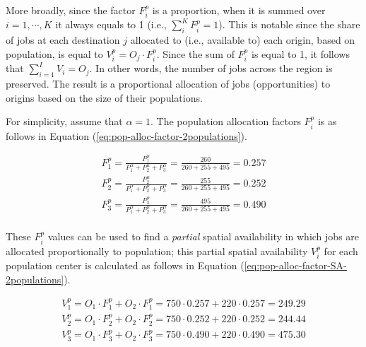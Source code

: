 \documentclass[]{elsarticle} %
\begin{document}
More broadly, since the factor \(F^p_{i}\) is a proportion, when it is
summed over \(i=1,\cdots,K\) it always equals to 1 (i.e.,
\(\sum_i^{K} F^p_{i} = 1\)). This is notable since the share of jobs at
each destination \(j\) allocated to (i.e., available to) each origin,
based on population, is equal to \(V^p_{i} = O_j \cdot F^p_{i}\). Since
the sum of \(F^p_{i}\) is equal to 1, it follows that
\(\sum_{i=1}^I V_{i} = O_j\). In other words, the number of jobs across
the region is preserved. The result is a proportional allocation of jobs
(opportunities) to origins based on the size of their populations.

For simplicity, assume that \(\alpha=1\). The population allocation
factors \(F^p_{i}\) is as follows in Equation
(\ref{eq:pop-alloc-factor-2populations}).

\begin{equation}
\label{eq:pop-alloc-factor-2populations}
\begin{array}{l}
F^p_{1} = \frac{P_1 ^\alpha}{P_1^\alpha + P_2^\alpha + P_3^\alpha} = \frac{260}{260 + 255 + 495} = 0.257\\
F^p_{2} = \frac{P_2^\alpha}{P_1^\alpha + P_2^\alpha + P_3^\alpha}  = \frac{255}{260 + 255 + 495} = 0.252\\
F^p_{3} = \frac{P_3^\alpha}{P_1^\alpha + P_2^\alpha + P_3^\alpha}  = \frac{495}{260 + 255 + 495} = 0.490\\
\end{array}
\end{equation}

These \(F^p_{i}\) values can be used to find a \emph{partial} spatial
availability in which jobs are allocated proportionally to population;
this partial spatial availability \(V^p_{i}\) for each population center
is calculated as follows in Equation
(\ref{eq:pop-alloc-factor-SA-2populations}).

\begin{equation}
\label{eq:pop-alloc-factor-SA-2populations}
\begin{array}{l}
V^p_{1} = O_1 \cdot F^p_{1} + O_2 \cdot F^p_{1} = 750 \cdot 0.257 + 220 \cdot 0.257 = 249.29 \\
V^p_{2} = O_1 \cdot F^p_{2} + O_2 \cdot F^p_{2} = 750 \cdot 0.252 + 220 \cdot 0.252 = 244.44 \\
V^p_{3} = O_1 \cdot F^p_{3} + O_2 \cdot F^p_{3}= 750 \cdot 0.490 + 220 \cdot 0.490 = 475.30 \\
\end{array}
\end{equation}
\end{document}
